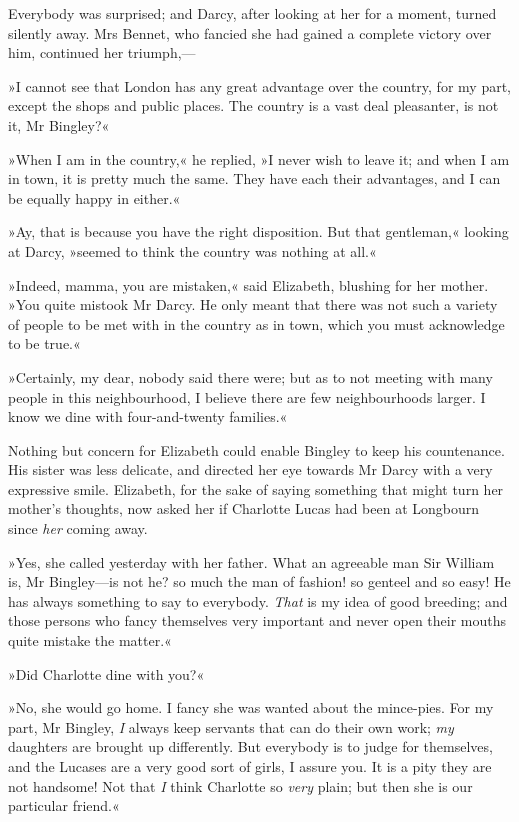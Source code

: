Everybody was surprised; and Darcy, after looking at her for a moment, turned silently away. Mrs Bennet, who fancied she had gained a complete victory over him, continued her triumph,—

»I cannot see that London has any great advantage over the country, for my part, except the shops and public places. The country is a vast deal pleasanter, is not it, Mr Bingley?«

»When I am in the country,« he replied, »I never wish to leave it; and when I am in town, it is pretty much the same. They have each their advantages, and I can be equally happy in either.«

»Ay, that is because you have the right disposition. But that gentleman,« looking at Darcy, »seemed to think the country was nothing at all.«

»Indeed, mamma, you are mistaken,« said Elizabeth, blushing for her mother. »You quite mistook Mr Darcy. He only meant that there was not such a variety of people to be met with in the country as in town, which you must acknowledge to be true.«

»Certainly, my dear, nobody said there were; but as to not meeting with many people in this neighbourhood, I believe there are few neighbourhoods larger. I know we dine with four-and-twenty families.«

Nothing but concern for Elizabeth could enable Bingley to keep his countenance. His sister was less delicate, and directed her eye towards Mr Darcy with a very expressive smile. Elizabeth, for the sake of saying something that might turn her mother's thoughts, now asked her if Charlotte Lucas had been at Longbourn since \textit{her} coming away.

»Yes, she called yesterday with her father. What an agreeable man Sir William is, Mr Bingley—is not he? so much the man of fashion! so genteel and so easy! He has always something to say to everybody. \textit{That} is my idea of good breeding; and those persons who fancy themselves very important and never open their mouths quite mistake the matter.«

»Did Charlotte dine with you?«

»No, she would go home. I fancy she was wanted about the mince-pies. For my part, Mr Bingley, \textit{I} always keep servants that can do their own work; \textit{my} daughters are brought up differently. But everybody is to judge for themselves, and the Lucases are a very good sort of girls, I assure you. It is a pity they are not handsome! Not that \textit{I} think Charlotte so \textit{very} plain; but then she is our particular friend.«

